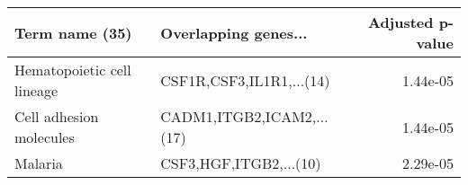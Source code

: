 \begin{tabular}{llr}
\toprule
            Term name (35) &      Overlapping genes... &  Adjusted p-value \\
\midrule
Hematopoietic cell lineage &  CSF1R,CSF3,IL1R1,...(14) &          1.44e-05 \\
   Cell adhesion molecules & CADM1,ITGB2,ICAM2,...(17) &          1.44e-05 \\
                   Malaria &    CSF3,HGF,ITGB2,...(10) &          2.29e-05 \\
\bottomrule
\end{tabular}
